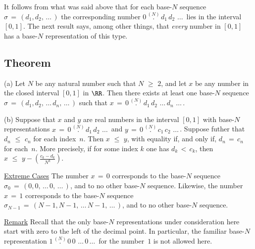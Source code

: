 \V

        It follows from what was said above that for each base-$N$ sequence ${\sigma} \,=\, (d_{1}, d_{2},\,{\ldots}\,)$
    the corresponding number $0\,\stackrel{(N)}{.}\,d_{1}\,d_{2}\,\,{\ldots}\,$ lies in the interval $[0,1]$.
    The next result says, among other things, that {\em every} number in $[0,1]$ has a base-$N$ representation of this type.

\V

            \subsection{\small{\bf Theorem}}
            \label{ThmB30.65B}

\V

\hspace*{\parindent} (a) Let $N$ be any natural number such that $N\,\,{\geq}\,\,2$,
    and let $x$ be any number in the closed interval $[0,1]$ in ${\RR}$. Then there exists at least one base-$N$ sequence
    ${\sigma} \,=\, (d_{1}, d_{2},\,{\ldots}\,d_{n},\,{\ldots}\,)$ such that $x \,=\, 0\,\stackrel{(N)}{.}\,d_{1}\,d_{2}\,\,{\ldots}\,d_{n}\,\,{\ldots}\,$.

\V

        (b) Suppose that $x$ and $y$ are real numbers in the interval $[0,1]$ with base-$N$ representations $x \,=\, 0\,\stackrel{(N)}{.}\,d_{1}\,d_{2}\,\,{\ldots}\,$ and $y \,=\, 0\,\stackrel{(N)}{.}\,c_{1}\,c_{2}\,\,{\ldots}\,$.
    Suppose futher that $d_{n}\,\,{\leq}\,\,c_{n}$ for each index~$n$.
    Then $x\,\,{\leq}\,\,y$, with equality if, and only if, $d_{n} \,=\, c_{n}$ for each~$n$.
    More precisely, if for some index $k$ one has $d_{k}\,<\,c_{k}$, then ${\displaystyle x\,\,{\leq}\,\,y-\left(\frac{c_{k}-d_{k}}{N^{k}}\right)}$.

        \underline{Extreme Cases} The number $x \,=\, 0$ corresponds to the base-$N$ sequence ${\sigma}_{0} \,=\, (0,0,\,{\ldots}\,0,\,{\ldots}\,)$,
    and to no other base-$N$ sequence. Likewise, the number $x \,=\, 1$ corresponds to the base-$N$ sequence
    ${\sigma}_{N-1} \,=\, (N-1,N-1,\,{\ldots}\,N-1,\,{\ldots}\,)$, and to no other base-$N$ sequence.

        \underline{Remark} Recall that the only base-$N$ representations under consideration here start with zero to the left of the decimal point.
    In particular, the familiar base-$N$ representation $1\,\stackrel{(N)}{.}\,0\,0\,\,{\ldots}\,0\,{\ldots}\,$ for the number~$1$ is not allowed here.

